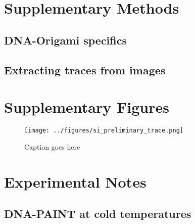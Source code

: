 \section{Supplementary Methods}
\subsection{DNA-Origami specifics}
\subsection{Extracting traces from images}

\section{Supplementary Figures}

\begin{figure*}
    \texttt{[image: ../figures/si\_preliminary\_trace.png]}
    \caption{Caption goes here}
    \label{fig:si:preliminary_trace}
\end{figure*}
  

\section{Experimental Notes}

\subsection{DNA-PAINT at cold temperatures}

